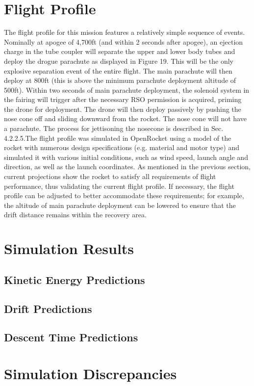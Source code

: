\section{Flight Profile}
The flight profile for this mission features a relatively simple sequence of events.
Nominally at apogee of 4,700ft (and within 2 seconds after apogee), an ejection charge
in the tube coupler will separate the upper and lower body tubes and deploy the drogue parachute as displayed in Figure 19. This will be the only explosive separation event of
the entire flight. The main parachute will then deploy at 800ft (this is above the minimum
parachute deployment altitude of 500ft). Within two seconds of main parachute
deployment, the solenoid system in the fairing will trigger after the necessary RSO
permission is acquired, priming the drone for deployment. The drone will then deploy
passively by pushing the nose cone off and sliding downward from the rocket. The nose
cone will not have a parachute. The process for jettisoning the nosecone is described in
Sec. 4.2.2.5.The flight profile was simulated in OpenRocket using a model of the rocket with numerous
design specifications (e.g. material and motor type) and simulated it with various initial
conditions, such as wind speed, launch angle and direction, as well as the launch
coordinates. As mentioned in the previous section, current projections show the rocket to
satisfy all requirements of flight performance, thus validating the current flight profile. If
necessary, the flight profile can be adjusted to better accommodate these requirements;
for example, the altitude of main parachute deployment can be lowered to ensure that the
drift distance remains within the recovery area.

\section{Simulation Results}
\subsection{Kinetic Energy Predictions}
\subsection{Drift Predictions}
\subsection{Descent Time Predictions}

\section{Simulation Discrepancies}